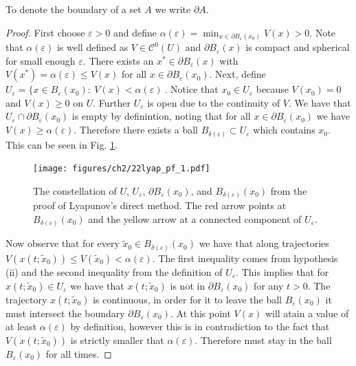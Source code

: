 	\begin{remark}[]
		To denote the boundary of a set $A$ we write $\partial A$.
	\end{remark}
\begin{proof}
	
	First choose $\varepsilon > 0$ and define $\alpha(\varepsilon)= \min_{x\in \partial B_\varepsilon(x_0)} V(x) > 0$. Note that $\alpha(\varepsilon)$ is well defined as $V\in \mathcal{C}^{0}(U)$ and $\partial B_{\varepsilon}(x)$ is compact and spherical for small enough $\varepsilon$. There exists an $x^{*} \in \partial B_{\varepsilon}(x)$ with $V(x^{*}) = \alpha(\varepsilon) \leq V(x)$ for all $x\in \partial B_{\varepsilon}(x_0)$. Next, define $U_{\varepsilon}= \{ x\in B_{\varepsilon}(x_0):\ V(x) < \alpha(\varepsilon)  \ $. Notice that $x_0 \in U_{\varepsilon}$ because $V(x_0) =0$ and $V(x)\geq 0$ on $U$. Further $U_{\varepsilon}$ is open due to the continuity of $V$. We have that  $U_{\varepsilon} \cap \partial B_{\varepsilon}(x_ 0) $ is empty by definintion, noting that for all $x\in \partial B_{\varepsilon}(x_0)$ we have $V(x) \geq \alpha(\varepsilon) $. Therefore there exists a ball $B_{\delta(\varepsilon)} \subset U_{\varepsilon} $ which contains $x_0$. This can be seen in Fig. \ref{fig:lyap_pf_1}.
\begin{figure}[h!]
	\centering
	\texttt{[image: figures/ch2/22lyap\_pf\_1.pdf]}
	\caption{The constellation of $U$, $U_\varepsilon$, $\partial B_{\varepsilon}(x_0)$, and $B_{\delta(\varepsilon)}(x_0)$ from the proof of Lyapunov's direct method. The red arrow points at $B_{\delta(\varepsilon)}(x_0)$ and the yellow arrow at a connected component of $U_\varepsilon$.}
	\label{fig:lyap_pf_1}
\end{figure}

Now observe that for every $\tilde{x}_{0} \in B_{\delta(\varepsilon)}(x_0)$ we have that along trajectories $V(x(t; \tilde{x}_{0})) \leq V(\tilde{x}_{0}) < \alpha(\varepsilon)$. The first inequality comes from hypothesis (ii) and the second inequality from the definition of $U_{\varepsilon}$. This implies that for $x(t; \tilde{x}_0) \in U_{\varepsilon}$ we have that $x(t; \tilde{x}_{0})$ is not in $\partial B_{\varepsilon}(x_0)$ for any $t> 0$. The trajectory $x(t; \tilde{x}_0)$ is continuous, in order for it to leave the ball $B_{\varepsilon}(x_0)$ it must intersect the boundary $\partial B_{\varepsilon}(x_0)$. At this point $V(x)$ will atain a value of at least $\alpha(\varepsilon)$ by definition, however this is in contradiction to the fact that $V(x(t;\tilde{x}_0))$ is strictly smaller that $\alpha(\varepsilon)$. Therefore must stay in the ball $B_{\varepsilon}(x_0)$ for all times.
\end{proof}

